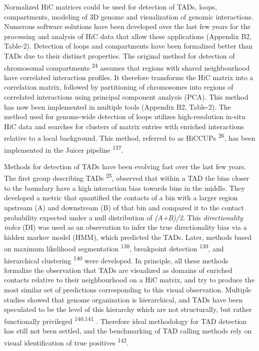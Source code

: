 \documentclass[11pt,twoside]{MPIthesis}
\theoremstyle{definition}
\theoremstyle{definition}
\theoremstyle{definition}
\theoremstyle{remark}
\begin{document}
Normalized HiC matrices could be used for detection of TADs, loops,
compartments, modeling of 3D genome and visualization of genomic
interactions. Numerous software solutions have been developed over the
last few years for the processing and analysis of HiC data that allow
these applications (Appendix B2, Table-2). Detection of loops and
compartments have been formalized better than TADs due to their distinct
properties. The original method for detection of chromosomal
compartments \textsuperscript{24} assumes that regions with shared
neighbourhood have correlated interaction profiles. It therefore
transforms the HiC matrix into a correlation matrix, followed by
partitioning of chromosomes into regions of correlated interactions
using principal component analysis (PCA). This method has now been
implemented in multiple tools (Appendix B2, Table-2). The method used
for genome-wide detection of loops utilizes high-resolution in-situ HiC
data and searches for clusters of matrix entries with enriched
interactions relative to a local background. This method, referred to as
HiCCUPs \textsuperscript{26}, has been implemented in the Juicer
pipeline \textsuperscript{137}.

Methods for detection of TADs have been evolving fast over the last few
years. The first group describing TADs \textsuperscript{25}, observed
that within a TAD the bins closer to the boundary have a high
interaction bias towards bins in the middle. They developed a metric
that quantified the contacts of a bin with a larger region upstream (A)
and downstream (B) of that bin and compared it to the contact
probability expected under a null distribution of \emph{(A+B)/2}. This
\emph{directionality index} (DI) was used as an observation to infer the
true directionality bias via a hidden markov model (HMM), which
predicted the TADs. Later, methods based on maximum likelihood
segmentation \textsuperscript{138}, breakpoint detection
\textsuperscript{139}, and hierarchical clustering \textsuperscript{140}
were developed. In principle, all these methods formalize the
observation that TADs are visualized as domains of enriched contacts
relative to their neighbourhood on a HiC matrix, and try to produce the
most similar set of predictions corresponding to this visual
observation. Multiple studies showed that genome organization is
hierarchical, and TADs have been speculated to be the level of this
hierarchy which are not structurally, but rather functionally privileged
\textsuperscript{140,141} . Therefore ideal methodology for TAD
detection has still not been settled, and the benchmarking of TAD
calling methods rely on visual identification of true positives
\textsuperscript{142}.
\end{document}

